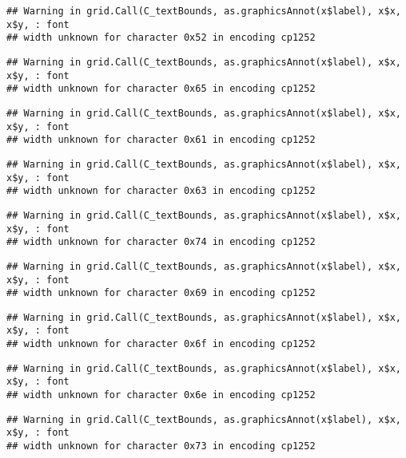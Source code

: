 \documentclass[
]{article}
\begin{document}
\begin{verbatim}
## Warning in grid.Call(C_textBounds, as.graphicsAnnot(x$label), x$x, x$y, : font
## width unknown for character 0x52 in encoding cp1252
\end{verbatim}

\begin{verbatim}
## Warning in grid.Call(C_textBounds, as.graphicsAnnot(x$label), x$x, x$y, : font
## width unknown for character 0x65 in encoding cp1252
\end{verbatim}

\begin{verbatim}
## Warning in grid.Call(C_textBounds, as.graphicsAnnot(x$label), x$x, x$y, : font
## width unknown for character 0x61 in encoding cp1252
\end{verbatim}

\begin{verbatim}
## Warning in grid.Call(C_textBounds, as.graphicsAnnot(x$label), x$x, x$y, : font
## width unknown for character 0x63 in encoding cp1252
\end{verbatim}

\begin{verbatim}
## Warning in grid.Call(C_textBounds, as.graphicsAnnot(x$label), x$x, x$y, : font
## width unknown for character 0x74 in encoding cp1252
\end{verbatim}

\begin{verbatim}
## Warning in grid.Call(C_textBounds, as.graphicsAnnot(x$label), x$x, x$y, : font
## width unknown for character 0x69 in encoding cp1252
\end{verbatim}

\begin{verbatim}
## Warning in grid.Call(C_textBounds, as.graphicsAnnot(x$label), x$x, x$y, : font
## width unknown for character 0x6f in encoding cp1252
\end{verbatim}

\begin{verbatim}
## Warning in grid.Call(C_textBounds, as.graphicsAnnot(x$label), x$x, x$y, : font
## width unknown for character 0x6e in encoding cp1252
\end{verbatim}

\begin{verbatim}
## Warning in grid.Call(C_textBounds, as.graphicsAnnot(x$label), x$x, x$y, : font
## width unknown for character 0x73 in encoding cp1252
\end{verbatim}
\end{document}
